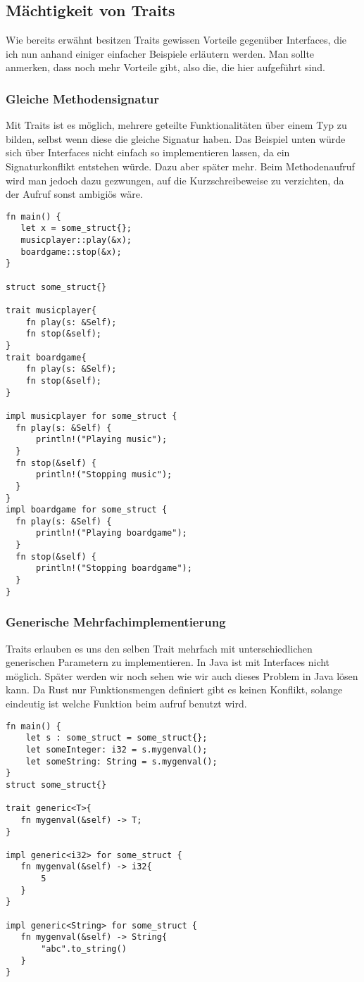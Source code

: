 \documentclass[a4paper, 1ppt]{article}
\begin{document}
\subsection{Mächtigkeit von Traits}
Wie bereits erwähnt besitzen Traits gewissen Vorteile gegenüber Interfaces, die ich nun anhand einiger einfacher Beispiele erläutern werden.
Man sollte anmerken, dass noch mehr Vorteile gibt, also die, die hier aufgeführt sind.
\subsubsection{Gleiche Methodensignatur}
Mit Traits ist es möglich, mehrere geteilte Funktionalitäten über einem Typ zu bilden, selbst wenn diese die gleiche Signatur haben.
Das Beispiel unten würde sich über Interfaces nicht einfach so implementieren lassen, da ein Signaturkonflikt entstehen würde. Dazu aber später mehr.
Beim Methodenaufruf wird man jedoch dazu gezwungen, auf die Kurzschreibeweise zu verzichten, da der Aufruf sonst ambigiös wäre.
\begin{verbatim}
fn main() {
   let x = some_struct{};
   musicplayer::play(&x);
   boardgame::stop(&x);
}

struct some_struct{}

trait musicplayer{
    fn play(s: &Self);
    fn stop(&self);
}
trait boardgame{
    fn play(s: &Self);
    fn stop(&self);
}

impl musicplayer for some_struct {
  fn play(s: &Self) {
      println!("Playing music");
  }
  fn stop(&self) {
      println!("Stopping music");
  }
}
impl boardgame for some_struct {
  fn play(s: &Self) {
      println!("Playing boardgame");
  }
  fn stop(&self) {
      println!("Stopping boardgame");
  }
}
\end{verbatim}
\subsubsection{Generische Mehrfachimplementierung}
Traits erlauben es uns den selben Trait mehrfach mit unterschiedlichen generischen Parametern zu implementieren.
In Java ist mit Interfaces nicht möglich. Später werden wir noch sehen wie wir auch dieses Problem in Java lösen kann.
Da Rust nur Funktionsmengen definiert gibt es keinen Konflikt, solange eindeutig ist welche Funktion beim aufruf benutzt wird.
\begin{verbatim}
fn main() {
    let s : some_struct = some_struct{};
    let someInteger: i32 = s.mygenval();
    let someString: String = s.mygenval();
}
struct some_struct{}

trait generic<T>{
   fn mygenval(&self) -> T;
}

impl generic<i32> for some_struct {
   fn mygenval(&self) -> i32{
       5
   }
}

impl generic<String> for some_struct {
   fn mygenval(&self) -> String{
       "abc".to_string()
   }
}
\end{verbatim}
\end{document}
